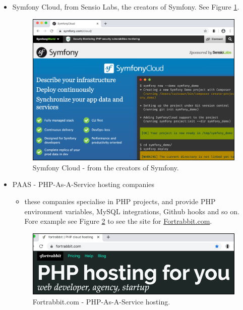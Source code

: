 \documentclass[a4paperpaper,openright]{book}
\providecommand{\tightlist}{%
  \setlength{\itemsep}{0pt}\setlength{\parskip}{0pt}}
\begin{document}
\begin{itemize}
\item
  Symfony Cloud, from Sensio Labs, the creators of Symfony. See Figure
  \ref{sfCloud}.

  \begin{figure}
  \centering
  \includegraphics{./tex2pdf.-5a4428120ede4be1/e6bbd8d18c9dc496b3cd41bbb14403128085bed7.png}
  \caption{Symfony Cloud - from the creators of Symfony.\label{sfCloud}}
  \end{figure}
\item
  PAAS - PHP-As-A-Service hosting companies

  \begin{itemize}
  \tightlist
  \item
    these companies specialise in PHP projects, and provide PHP
    environment variables, MySQL integrations, Github hooks and so on.
    Fore example see Figure \ref{paas} to see the site for
    \url{Fortrabbit.com}.
  \end{itemize}

  \begin{figure}
  \centering
  \includegraphics{./tex2pdf.-5a4428120ede4be1/705868fe300961a7b7b0974c558cd3a425e1b8ff.png}
  \caption{Fortrabbit.com - PHP-As-A-Service hosting.\label{paas}}
  \end{figure}
\end{itemize}
\end{document}
